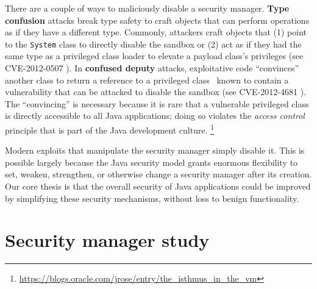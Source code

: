 \documentclass{sig-alternate-05-2015}
\begin{document}
There are a couple of ways to maliciously disable a security manager.
\textbf{Type confusion} attacks break type
safety to craft objects that can perform operations as if they have
a different type.  Commonly, attackers craft objects that (1) point to the \texttt{System} class to directly disable the sandbox or (2) act as if they had
the same type as a privileged class loader to elevate a payload class's privileges (see CVE-2012-0507 \cite{_vulnerability_2012_0507}). In \textbf{confused deputy} attacks,
exploitative code ``convinces'' another 
class to return a reference to a privileged class~\cite{hardy_confused_1988}
known to contain a vulnerability that can be attacked to disable the sandbox 
(see CVE-2012-4681 \cite{_vulnerability_2012_4681}).
The ``convincing'' is necessary
because it is rare that a vulnerable privileged class is directly accessible
to all Java applications; doing so violates the \textit{access
control} principle that is part of the Java development culture.%
\footnote{\url{https://blogs.oracle.com/jrose/entry/the_isthmus_in_the_vm}%
} 

%
  
Modern exploits that manipulate the security manager simply disable it.  This is possible largely because the Java security model
grants enormous flexibility to
set, weaken, strengthen, or otherwise change a security
manager after its creation.
Our core thesis is that the overall security of Java applications could be improved by
simplifying these security mechanisms, without loss to benign functionality.

\section{Security manager study}\label{sec:Security-Manager-Study}
\end{document}
